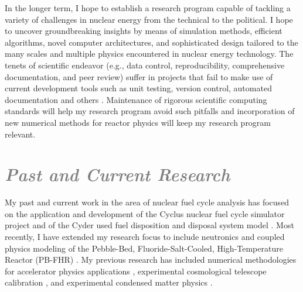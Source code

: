 \documentclass[a4paper, 10pt]{article}
\begin{document}
In the longer term, I hope to establish a research program capable of tackling a 
variety of challenges in nuclear energy from the technical to the political.  I 
hope to uncover groundbreaking insights by means of simulation methods, 
efficient algorithms, novel computer architectures, and sophisticated design 
tailored to the many scales and multiple physics encountered in nuclear energy 
technology.  The tenets of scientific endeavor (e.g., data control, 
reproducibility, comprehensive documentation, and peer review) suffer in 
projects that fail to make use of current development tools such as unit 
testing, version control, automated documentation and others 
\cite{wilson_best_2014, merali_computational_2010}. Maintenance of rigorous 
scientific computing standards will help my research program avoid such pitfalls 
\cite{huff_rapid_2011} and incorporation of new numerical methods for reactor 
physics will keep my research program relevant.

\section*{\textcolor{gray}{\it Past and Current Research}}

My past and current work in the area of nuclear fuel cycle analysis has focused 
on the application and development of the Cyclus nuclear fuel cycle simulator 
project \cite{cyclus_github_2011} and of the Cyder used fuel disposition and 
disposal system model \cite{cyder_github_2012, huff_integrated_2013}. Most 
recently, I have extended my research focus to include neutronics and coupled 
physics modeling of the Pebble-Bed, Fluoride-Salt-Cooled, High-Temperature 
Reactor (PB-FHR) \cite{facilitators_fluoride-salt-cooled_2013, 
facilitators_fluoride-salt-cooled_2013-1, 
facilitators_fluoride-salt-cooled_2013-2, 
facilitators_fluoride-salt-cooled_2013-3}.  My previous research has included 
numerical methodologies for accelerator physics applications 
\cite{huff_single_2003, huff_digital_2004}, experimental cosmological telescope 
calibration \cite{huff_celestial_2008}, and experimental condensed matter 
physics \cite{clerc_liquid_2008}. 


\end{document}
